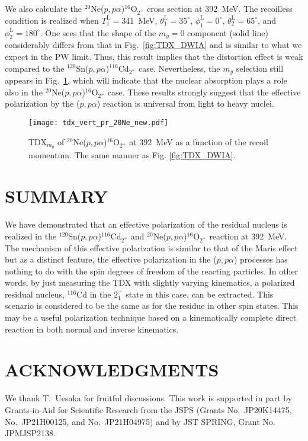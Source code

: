 \documentclass[%
 reprint,
superscriptaddress,
 amsmath,amssymb,
 aps,
]{revtex4-2}
\begin{document}
We also calculate the $^{20}$Ne($p,p\alpha$)$^{16}$O$_{2^+}$ cross section at 392~MeV.
The recoilless condition is realized when $T^\mathrm{L}_1 = 341$~MeV, $\theta_1^\mathrm{L} = 35^\circ$, 
$\phi_1^\mathrm{L} = 0^\circ$, 
$\theta_2^\mathrm{L} = 65^\circ$, and $\phi_2^\mathrm{L} = 180^\circ$.
One sees that the shape of the $m_y=0$ component (solid line) considerably differs from that in Fig.~\ref{fig:TDX_DWIA} and is similar to what we expect in the PW limit. Thus, this result implies that the distortion effect is weak compared to the $^{120}$Sn($p,p\alpha$)$^{116}$Cd$_{2^+}$ case. Nevertheless, the $m_y$ selection still appears in Fig.~\ref{fig:TDX_Ne}, which will indicate that the nuclear absorption plays a role also in the $^{20}$Ne($p,p\alpha$)$^{16}$O$_{2^+}$ case.
These results strongly suggest that the effective polarization by the ($p,p\alpha$) reaction is universal from light to heavy nuclei. 
\begin{figure}[h]
  \centering
  \texttt{[image: tdx\_vert\_pr\_20Ne\_new.pdf]}
  \caption{TDX$_{m_y}$ of $^{20}$Ne($p,p\alpha$)$^{16}$O$_{2^+}$ at 392~MeV 
  as a function of the recoil momentum. 
  The same manner as Fig. \ref{fig:TDX_DWIA}.}
  \label{fig:TDX_Ne}
\end{figure}

\section{SUMMARY}\label{sec:summary}
We have demonstrated that an effective polarization of 
the residual nucleus is realized in 
the $^{120}$Sn($p,p\alpha$)$^{116}$Cd$_{2^+}$ and $^{20}$Ne($p,p\alpha$)$^{16}$O$_{2^+}$ reaction at 392~MeV. 
The mechanism of this effective polarization is similar to 
that of the Maris effect but as a distinct feature, 
the effective polarization in the ($p,p\alpha$) processes has nothing to do with 
the spin degrees of freedom of the reacting particles. 
In other words, by just measuring the TDX with slightly varying kinematics, 
a polarized residual nucleus, $^{116}$Cd in the $2_1^+$ state in this case, 
can be extracted. 
This scenario is considered to be the same as for the residue in other spin states.
This may be a useful polarization technique based on 
a kinematically complete direct reaction 
in both normal and inverse kinematics.

\section*{ACKNOWLEDGMENTS}
We thank T.~Uesaka for fruitful discussions. 
This work is supported in part by Grants-in-Aid for Scientific Research 
from the JSPS (Grants No.~JP20K14475, No.~JP21H00125, and No.~JP21H04975) and by JST SPRING, Grant No. JPMJSP2138.



\end{document}
